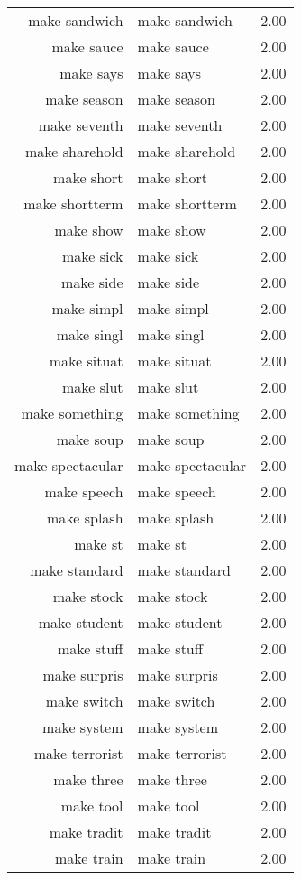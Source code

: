 \begin{table}[ht]
\begin{tabular}{rlr}
  make sandwich & make sandwich & 2.00 \\ 
  make sauce & make sauce & 2.00 \\ 
  make says & make says & 2.00 \\ 
  make season & make season & 2.00 \\ 
  make seventh & make seventh & 2.00 \\ 
  make sharehold & make sharehold & 2.00 \\ 
  make short & make short & 2.00 \\ 
  make shortterm & make shortterm & 2.00 \\ 
  make show & make show & 2.00 \\ 
  make sick & make sick & 2.00 \\ 
  make side & make side & 2.00 \\ 
  make simpl & make simpl & 2.00 \\ 
  make singl & make singl & 2.00 \\ 
  make situat & make situat & 2.00 \\ 
  make slut & make slut & 2.00 \\ 
  make something & make something & 2.00 \\ 
  make soup & make soup & 2.00 \\ 
  make spectacular & make spectacular & 2.00 \\ 
  make speech & make speech & 2.00 \\ 
  make splash & make splash & 2.00 \\ 
  make st & make st & 2.00 \\ 
  make standard & make standard & 2.00 \\ 
  make stock & make stock & 2.00 \\ 
  make student & make student & 2.00 \\ 
  make stuff & make stuff & 2.00 \\ 
  make surpris & make surpris & 2.00 \\ 
  make switch & make switch & 2.00 \\ 
  make system & make system & 2.00 \\ 
  make terrorist & make terrorist & 2.00 \\ 
  make three & make three & 2.00 \\ 
  make tool & make tool & 2.00 \\ 
  make tradit & make tradit & 2.00 \\ 
  make train & make train & 2.00 \\ 

\end{tabular}
\end{table}
